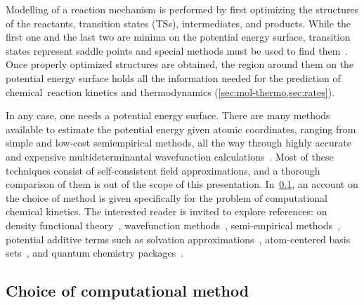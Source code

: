 Modelling of a reaction mechanism is performed by first optimizing the structures of the reactants,
transition states (TSs),
intermediates,
and products.
While the first one and the last two are minima on the potential energy surface,
transition states represent saddle points and special methods must be used to find them~\cite{Banerjee_1985,Schlegel_1987,Peng_1993,Peng_1996,Henkelman_2000a,Henkelman_2000b,Henkelman_2002,Mauro_2005,Sheppard_2008,Zimmerman_2013a,Zimmerman_2013b,Zimmerman_2015,Jafari_2017}.
Once properly optimized structures are obtained,
the region around them on the potential energy surface holds all the information needed for the prediction of chemical~reaction kinetics and thermodynamics (\cref{sec:mol-thermo,sec:rates}).

In any case,
one needs a potential energy surface.
There are many methods available to estimate the potential energy given atomic coordinates,
ranging from simple and low-cost semiempirical methods,
all the way through highly accurate and expensive multideterminantal wavefunction calculations~\cite{Perdew_2001}.
Most of these techniques consist of self-consistent field approximations,
and a thorough comparison of them is out of the scope of this presentation.
In~\cref{sec:choice-of-method},
an account on the choice of method is given specifically for the problem of computational chemical kinetics.
The interested reader is invited to explore references:
on density functional theory~\cite{Hohenberg_1964,Kohn_1965,Perdew_1996,Perdew_1997,Ernzerhof_1999,Adamo_1999,Chai_2008a,Chai_2008b,Goerigk_2011,Arago_2011,Salzner_2011,Burns_2011,Minenkov_2012,Perdew_2014,Kryachko_2014,Yu_2016,DFT2016_poll},
wavefunction methods~\cite{Szabo_1996,Riplinger_2013,Riplinger_2016},
semi-empirical methods~\cite{MOPAC,Bannwarth_2020},
potential additive terms such
as solvation approximations~\cite{Marenich_2009,Marenich_2012},
atom-centered basis sets~\cite{Ditchfield_1971,Hehre_1972,Hariharan_1973,Hariharan_1974,Gordon_1980,Francl_1982,Clark_1983,Frisch_1984,Binning_1990,Szabo_1996,Helgaker_1997,Blaudeau_1997,Rassolov_1998,Rassolov_2001,Jensen_2012,Hill_2012},
and quantum chemistry packages~\cite{g09,Neese_2017}.

\subsection{Choice of computational method}%
\label{sec:choice-of-method}

